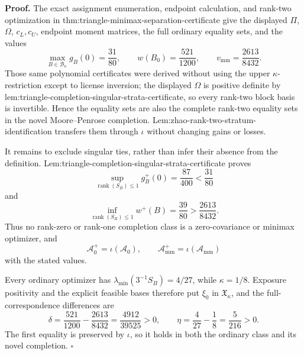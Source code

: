 \textbf{Proof.}
The exact assignment enumeration, endpoint calculation, and rank-two optimization in thm:triangle-minimax-separation-certificate give the displayed \(\Pi\), \(\Omega\), \(c_L,c_U\), endpoint moment matrices, the full ordinary equality sets, and the values
\[
 \max_{B\in\mathcal B_\kappa}g_B(0)=\frac{31}{80},
 \qquad w(B_0)=\frac{521}{1200},
 \qquad v_{\mathrm{mm}}=\frac{2613}{8432}.
\]
Those same polynomial certificates were derived without using the upper \(\kappa\)-restriction except to license inversion; the displayed \(\Omega\) is positive definite by lem:triangle-completion-singular-strata-certificate, so every rank-two block basis is invertible.  Hence the equality sets are also the complete rank-two equality sets in the novel Moore--Penrose completion.  Lem:zhao-rank-two-stratum-identification transfers them through \(\iota\) without changing gains or losses.

It remains to exclude singular ties, rather than infer their absence from the definition.  Lem:triangle-completion-singular-strata-certificate proves
\[
 \sup_{\operatorname{rank}(S_B)\le1}g_B^+(0)=\frac{87}{400}<\frac{31}{80}
\]
and
\[
 \inf_{\operatorname{rank}(S_B)\le1}w^+(B)=\frac{39}{80}>\frac{2613}{8432}.
\]
Thus no rank-zero or rank-one completion class is a zero-covariance or minimax optimizer, and
\[
 \mathcal A_0^+=\iota(\mathcal A_0),
 \qquad \mathcal A_{\mathrm{mm}}^+=\iota(\mathcal A_{\mathrm{mm}})
\]
with the stated values.

Every ordinary optimizer has \(\lambda_{\min}(3^{-1}S_B)=4/27\), while \(\kappa=1/8\).  Exposure positivity and the explicit feasible bases therefore put \(\xi_0\) in \(\mathfrak X_\kappa\), and the full-correspondence differences are
\[
 \delta=\frac{521}{1200}-\frac{2613}{8432}=\frac{4912}{39525}>0,
 \qquad \eta=\frac4{27}-\frac18=\frac5{216}>0.
\]
The first equality is preserved by \(\iota\), so it holds in both the ordinary class and its novel completion. \(\square\)
